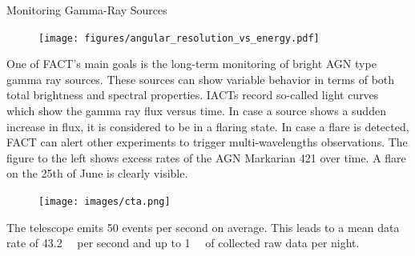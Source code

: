 \begin{multicols}{2}









    \begin{block}[equal height group=A]{Monitoring Gamma-Ray Sources}%
      \begin{multicols}{2}
        \begin{figure}
          \texttt{[image: figures/angular\_resolution\_vs\_energy.pdf]}\\
        \end{figure}
        \columnbreak
        One of FACT’s main goals is the long-term monitoring of bright AGN type gamma ray sources.
        These sources can show variable behavior in terms of both total brightness and spectral properties.
        IACTs record so-called light curves which show the gamma ray  flux versus time.
        In case a source shows a sudden increase in  flux, it is considered to be in a flaring state.
        In case a  flare is detected, FACT can alert other experiments to trigger multi-wavelengths observations.
        The figure to the left shows excess rates of the AGN Markarian 421 over time.
        A flare on the 25th of June is clearly visible.
      \end{multicols}
    \end{block}%

    \columnbreak

        \begin{center}

        \begin{streamblock}[equal height group=C, width=0.6\linewidth]{0mm}{-5mm}{}%
          \begin{multicols}{2}
            \begin{figure}
              \texttt{[image: images/cta.png]}
            \end{figure}
            \columnbreak
            The telescope emits \num{50} events per second on average. This leads to a mean data rate of \SI{43.2}{\mega \byte} per second and up to
            \SI{1}{\tera \byte} of collected raw data per night.
          \end{multicols}
        \end{streamblock}%


\end{center}
\end{multicols}
